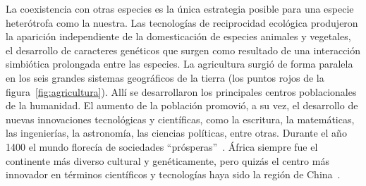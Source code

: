 \documentclass[a4paper,10pt]{book}
\theoremstyle{definition}
\begin{document}

La coexistencia con otras especies es la única estrategia posible para una especie heterótrofa como la nuestra.
%
Las tecnolog\'ias de reciprocidad ecol\'ogica produjeron la aparici\'on independiente de la domesticaci\'on de especies animales y vegetales, el desarrollo de caracteres gen\'eticos que surgen como resultado de una interacci\'on simbiótica prolongada entre las especies.
%
La agricultura surgi\'o de forma paralela en los seis grandes sistemas geogr\'aficos de la tierra (los puntos rojos de la figura~\ref{fig:agricultura}).
%
Allí se desarrollaron los principales centros poblacionales de la humanidad.
%
El aumento de la poblaci\'on promovi\'o, a su vez, el desarrollo de nuevas innovaciones tecnol\'ogicas y cient\'ificas, como la escritura, la matem\'aticas, las ingenier\'ias, la astronom\'ia, las ciencias pol\'iticas, entre otras.
%
Durante el a\~no 1400 el mundo florec\'ia de sociedades ``pr\'osperas''~\cite{dussel2004-sistemaMundo}.
%
%
África siempre fue el continente m\'as diverso cultural y gen\'eticamente, pero quiz\'as el centro m\'as innovador en t\'erminos cient\'ificos y tecnolog\'ias haya sido la regi\'on de China~\cite{needham2004-generalConclusionsAndReflections}.

\end{document}
